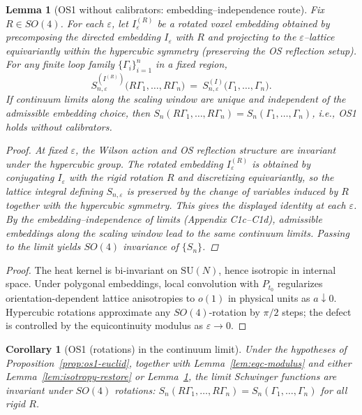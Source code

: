 \documentclass[11pt]{amsart}
\theoremstyle{plain}
\newtheorem{lemma}[theorem]{Lemma}
\newtheorem{corollary}[theorem]{Corollary}
\theoremstyle{definition}
\theoremstyle{remark}
\begin{document}
\begin{lemma}[OS1 without calibrators: embedding–independence route]\label{lem:os1-embedding}
Fix $R\in SO(4)$. For each $\varepsilon$, let $I^{(R)}_\varepsilon$ be a rotated voxel embedding obtained by precomposing the directed embedding $I_\varepsilon$ with $R$ and projecting to the $\varepsilon$–lattice equivariantly within the hypercubic symmetry (preserving the OS reflection setup). For any finite loop family $\{\Gamma_i\}_{i=1}^n$ in a fixed region,
\[
  S_{n,\varepsilon}^{(I^{(R)})}\big(R\Gamma_1,\dots,R\Gamma_n\big)
  \
  =\ S_{n,\varepsilon}^{(I)}\big(\Gamma_1,\dots,\Gamma_n\big).
\]
If continuum limits along the scaling window are unique and independent of the admissible embedding choice, then $S_n(R\Gamma_1,\dots,R\Gamma_n)=S_n(\Gamma_1,\dots,\Gamma_n)$, i.e., OS1 holds without calibrators.

\begin{proof}
At fixed $\varepsilon$, the Wilson action and OS reflection structure are invariant under the hypercubic group. The rotated embedding $I^{(R)}_\varepsilon$ is obtained by conjugating $I_\varepsilon$ with the rigid rotation $R$ and discretizing equivariantly, so the lattice integral defining $S_{n,\varepsilon}$ is preserved by the change of variables induced by $R$ together with the hypercubic symmetry. This gives the displayed identity at each $\varepsilon$. By the embedding–independence of limits (Appendix C1c–C1d), admissible embeddings along the scaling window lead to the same continuum limits. Passing to the limit yields $SO(4)$ invariance of $\{S_n\}$.
\end{proof}
\end{lemma}

\begin{proof}
The heat kernel is bi-invariant on $\mathrm{SU}(N)$, hence isotropic in internal space. Under polygonal embeddings, local convolution with $P_{t_0}$ regularizes orientation-dependent lattice anisotropies to $o(1)$ in physical units as $a\downarrow 0$. Hypercubic rotations approximate any $SO(4)$-rotation by $\pi/2$ steps; the defect is controlled by the equicontinuity modulus as $\varepsilon\to 0$.
\end{proof}

\begin{corollary}[OS1 (rotations) in the continuum limit]\label{cor:os1-rotations}
Under the hypotheses of Proposition~\ref{prop:os1-euclid}, together with Lemma~\ref{lem:eqc-modulus} and either Lemma~\ref{lem:isotropy-restore} or Lemma~\ref{lem:os1-embedding}, the limit Schwinger functions are invariant under $SO(4)$ rotations: $S_n(R\Gamma_1,\dots,R\Gamma_n)=S_n(\Gamma_1,\dots,\Gamma_n)$ for all rigid $R$.
\end{corollary}
\end{document}

